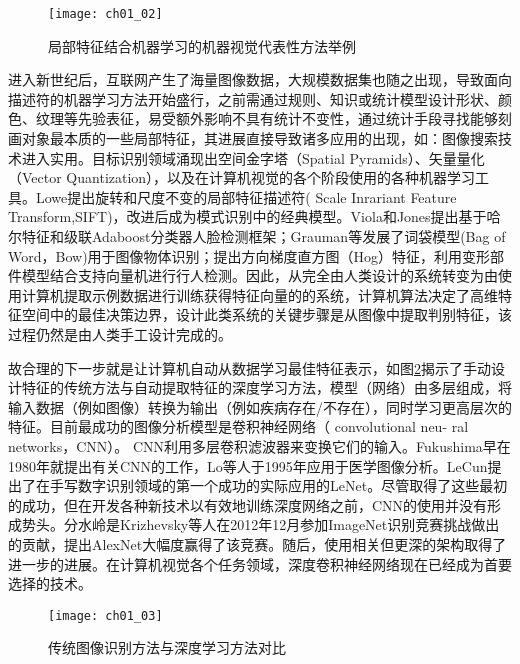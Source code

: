 \begin{figure}[!htbp]
    \centering
    \texttt{[image: ch01\_02]}
    \caption{局部特征结合机器学习的机器视觉代表性方法举例}
    \label{fig:ch01_02}
\end{figure}

进入新世纪后，互联网产生了海量图像数据，大规模数据集也随之出现，导致面向描述符的机器学习方法开始盛行，之前需通过规则、知识或统计模型设计形状、颜色、纹理等先验表征，易受额外影响不具有统计不变性，通过统计手段寻找能够刻画对象最本质的一些局部特征，其进展直接导致诸多应用的出现，如：图像搜索技术进入实用。目标识别领域涌现出空间金字塔（Spatial Pyramids）\cite{Lazebnik2006}、矢量量化（Vector Quantization）\cite{Yang2009b}，以及在计算机视觉的各个阶段使用的各种机器学习工具。Lowe\cite{Lowe2004}提出旋转和尺度不变的局部特征描述符( Scale Inrariant Feature Transform,SIFT)，改进后成为模式识别中的经典模型。Viola和Jones\cite{Viola2001}提出基于哈尔特征和级联Adaboost分类器人脸检测框架；Grauman等\cite{Grauman2005}发展了词袋模型(Bag of Word，Bow)用于图像物体识别；\cite{}提出方向梯度直方图（Hog）特征，利用变形部件模型结合支持向量机进行行人检测。因此，从完全由人类设计的系统转变为由使用计算机提取示例数据进行训练获得特征向量的的系统，计算机算法决定了高维特征空间中的最佳决策边界，设计此类系统的关键步骤是从图像中提取判别特征，该过程仍然是由人类手工设计完成的。

故合理的下一步就是让计算机自动从数据学习最佳特征表示，如图\ref{fig:ch01_03}揭示了手动设计特征的传统方法与自动提取特征的深度学习方法，模型（网络）由多层组成，将输入数据（例如图像）转换为输出（例如疾病存在/不存在），同时学习更高层次的特征。目前最成功的图像分析模型是卷积神经网络（ convolutional neu- ral networks，CNN）。 CNN利用多层卷积滤波器来变换它们的输入。Fukushima早在1980年就提出有关CNN的工作，Lo等人于1995年应用于医学图像分析。LeCun提出了在手写数字识别领域的第一个成功的实际应用的LeNet。尽管取得了这些最初的成功，但在开发各种新技术以有效地训练深度网络之前，CNN的使用并没有形成势头。分水岭是Krizhevsky等人在2012年12月参加ImageNet识别竞赛挑战做出的贡献，提出AlexNet大幅度赢得了该竞赛。随后，使用相关但更深的架构取得了进一步的进展\cite{}。在计算机视觉各个任务领域，深度卷积神经网络现在已经成为首要选择的技术。
\begin{figure}[!htbp]
    \centering
    \texttt{[image: ch01\_03]}
    \caption{传统图像识别方法与深度学习方法对比}
    \label{fig:ch01_03}
\end{figure}


